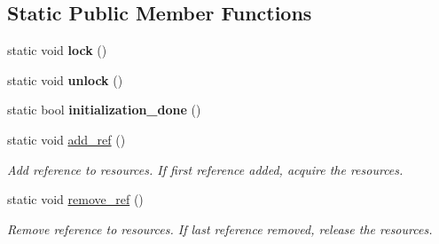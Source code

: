 \subsection*{Static Public Member Functions}
\begin{DoxyCompactItemize}
\item 
\hypertarget{classtbb_1_1internal_1_1____TBB__InitOnce_a49dd7a4f24e456e32c17d6f179b1afa4}{}static void {\bfseries lock} ()\label{classtbb_1_1internal_1_1____TBB__InitOnce_a49dd7a4f24e456e32c17d6f179b1afa4}

\item 
\hypertarget{classtbb_1_1internal_1_1____TBB__InitOnce_a75be47587acf7b182b90c2d692dd0646}{}static void {\bfseries unlock} ()\label{classtbb_1_1internal_1_1____TBB__InitOnce_a75be47587acf7b182b90c2d692dd0646}

\item 
\hypertarget{classtbb_1_1internal_1_1____TBB__InitOnce_a3d6e09b5b23edf10600c2ae2e6469659}{}static bool {\bfseries initialization\+\_\+done} ()\label{classtbb_1_1internal_1_1____TBB__InitOnce_a3d6e09b5b23edf10600c2ae2e6469659}

\item 
\hypertarget{classtbb_1_1internal_1_1____TBB__InitOnce_aeb552d69cd0db07e0ec3526c22e8899a}{}static void \hyperlink{classtbb_1_1internal_1_1____TBB__InitOnce_aeb552d69cd0db07e0ec3526c22e8899a}{add\+\_\+ref} ()\label{classtbb_1_1internal_1_1____TBB__InitOnce_aeb552d69cd0db07e0ec3526c22e8899a}

\begin{DoxyCompactList}\small\item\em Add reference to resources. If first reference added, acquire the resources. \end{DoxyCompactList}\item 
\hypertarget{classtbb_1_1internal_1_1____TBB__InitOnce_a78b2b1b7265cdedc9ea3689fff04ac35}{}static void \hyperlink{classtbb_1_1internal_1_1____TBB__InitOnce_a78b2b1b7265cdedc9ea3689fff04ac35}{remove\+\_\+ref} ()\label{classtbb_1_1internal_1_1____TBB__InitOnce_a78b2b1b7265cdedc9ea3689fff04ac35}

\begin{DoxyCompactList}\small\item\em Remove reference to resources. If last reference removed, release the resources. \end{DoxyCompactList}\end{DoxyCompactItemize}
